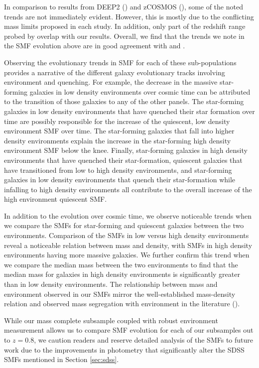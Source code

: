 \documentclass{emulateapj}
\begin{document}
In comparison to results from DEEP2 (\citealt{bundy06a}) and zCOSMOS (\citealt{Bolzonella:2010aa}), some of the noted trends are not immediately evident. However, this is mostly due to the conflicting mass limits proposed in each study. In addition, only part of the redshift range probed by \cite{bundy06a} overlap with our results. Overall, we find that the trends we note in the SMF evolution above are in good agreement with \cite{bundy06a} and \cite{Bolzonella:2010aa}. 

Observing the evolutionary trends in SMF for each of these sub-populations provides a narrative of the different galaxy evolutionary tracks involving environment and quenching. For example, the decrease in the massive star-forming galaxies in low density environments over cosmic time can be attributed to the transition of those galaxies to any of the other panels. The star-forming galaxies in low density environments that have quenched their star formation over time are possibly responsible for the increase of the quiescent, low density environment SMF over time. The star-forming galaxies that fall into higher density environments explain the increase in the star-forming high density environment SMF below the knee. Finally, star-forming galaxies in high density environments that have quenched their star-formation, quiescent galaxies that have transitioned from low to high density environments, and star-forming galaxies in low density environments that quench their star-formation while infalling to high density environments all contribute to the overall increase of the high environment quiescent SMF.

In addition to the evolution over cosmic time, we observe noticeable trends when we compare the SMFs for star-forming and quiescent galaxies between the two environments. Comparison of the SMFs in low versus high density environments reveal a noticeable relation between mass and density, with SMFs in high density environments having more massive galaxies. We further confirm this trend when we compare the median mass between the two environments to find that the median mass for galaxies in high density environments is significantly greater than in low density environments. The relationship between mass and environment observed in our SMFs mirror the well-established mass-density relation and observed mass segregation with environment in the literature (\citealt{bundy06a, Scodeggio:2009aa, Bolzonella:2010aa}).

While our mass complete subsample coupled with robust environment measurement allows us to compare SMF evolution for each of our subsamples out to $z=0.8$, we caution readers and reserve detailed analysis of the SMFs to future work due to the improvements in photometry that significantly alter the SDSS SMFs mentioned in Section \ref{sec:sdss}. 
\end{document}
